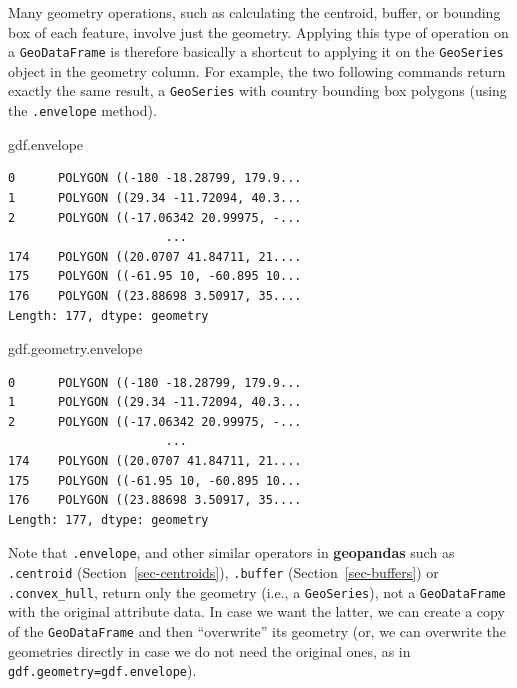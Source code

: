 \documentclass[
  letterpaper,
]{krantz}
\newenvironment{Shaded}{\begin{snugshade}}{\end{snugshade}}
\newcommand{\NormalTok}[1]{\textcolor[rgb]{0.00,0.23,0.31}{#1}}
\begin{document}
Many geometry operations, such as calculating the centroid, buffer, or
bounding box of each feature, involve just the geometry. Applying this
type of operation on a \texttt{GeoDataFrame} is therefore basically a
shortcut to applying it on the \texttt{GeoSeries} object in the geometry
column. For example, the two following commands return exactly the same
result, a \texttt{GeoSeries} with country bounding box polygons (using
the \texttt{.envelope} method).

\begin{Shaded}
\begin{Highlighting}[]
\NormalTok{gdf.envelope}
\end{Highlighting}
\end{Shaded}

\begin{verbatim}
0      POLYGON ((-180 -18.28799, 179.9...
1      POLYGON ((29.34 -11.72094, 40.3...
2      POLYGON ((-17.06342 20.99975, -...
                      ...                
174    POLYGON ((20.0707 41.84711, 21....
175    POLYGON ((-61.95 10, -60.895 10...
176    POLYGON ((23.88698 3.50917, 35....
Length: 177, dtype: geometry
\end{verbatim}

\begin{Shaded}
\begin{Highlighting}[]
\NormalTok{gdf.geometry.envelope}
\end{Highlighting}
\end{Shaded}

\begin{verbatim}
0      POLYGON ((-180 -18.28799, 179.9...
1      POLYGON ((29.34 -11.72094, 40.3...
2      POLYGON ((-17.06342 20.99975, -...
                      ...                
174    POLYGON ((20.0707 41.84711, 21....
175    POLYGON ((-61.95 10, -60.895 10...
176    POLYGON ((23.88698 3.50917, 35....
Length: 177, dtype: geometry
\end{verbatim}

Note that \texttt{.envelope}, and other similar operators in
\textbf{geopandas} such as \texttt{.centroid}
(Section~\ref{sec-centroids}), \texttt{.buffer}
(Section~\ref{sec-buffers}) or \texttt{.convex\_hull}, return only the
geometry (i.e., a \texttt{GeoSeries}), not a \texttt{GeoDataFrame} with
the original attribute data. In case we want the latter, we can create a
copy of the \texttt{GeoDataFrame} and then ``overwrite'' its geometry
(or, we can overwrite the geometries directly in case we do not need the
original ones, as in \texttt{gdf.geometry=gdf.envelope}).
\end{document}
